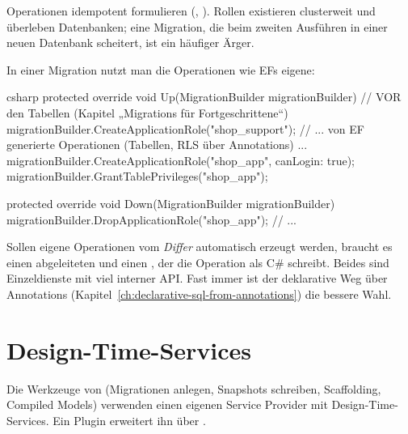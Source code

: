 \begin{tip}
  Operationen idempotent formulieren (, ). Rollen existieren clusterweit und
  überleben Datenbanken; eine Migration, die beim zweiten Ausführen in einer neuen Datenbank
  scheitert, ist ein häufiger Ärger.
\end{tip}

In einer Migration nutzt man die Operationen wie EFs eigene:

\begin{sourcecode}{csharp}
protected override void Up(MigrationBuilder migrationBuilder)
{
    // VOR den Tabellen (Kapitel „Migrations für Fortgeschrittene“)
    migrationBuilder.CreateApplicationRole("shop_support");
    // ... von EF generierte Operationen (Tabellen, RLS über Annotations) ...
    migrationBuilder.CreateApplicationRole("shop_app", canLogin: true);
    migrationBuilder.GrantTablePrivileges("shop_app");
}

protected override void Down(MigrationBuilder migrationBuilder)
{
    migrationBuilder.DropApplicationRole("shop_app");
    // ...
}
\end{sourcecode}

\begin{note}
  Sollen eigene Operationen vom \emph{Differ} automatisch erzeugt werden, braucht es einen
  abgeleiteten  und einen
  , der die
  Operation als C\# schreibt. Beides sind Einzeldienste mit viel interner API. Fast immer
  ist der deklarative Weg über Annotations
  (Kapitel~\ref{ch:declarative-sql-from-annotations}) die bessere Wahl.
\end{note}

\chapter{Design-Time-Services}\label{ch:design-time-services}

Die Werkzeuge von  (Migrationen anlegen, Snapshots schreiben, Scaffolding,
Compiled Models) verwenden einen eigenen Service Provider mit Design-Time-Services. Ein
Plugin erweitert ihn über .

